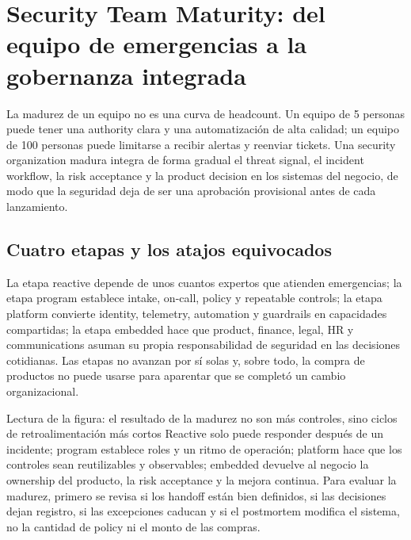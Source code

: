 \section{Security Team Maturity: del equipo de emergencias a la gobernanza integrada}

La madurez de un equipo no es una curva de headcount. Un equipo de 5 personas puede tener una authority clara y una automatización de alta calidad; un equipo de 100 personas puede limitarse a recibir alertas y reenviar tickets. Una security organization madura integra de forma gradual el threat signal, el incident workflow, la risk acceptance y la product decision en los sistemas del negocio, de modo que la seguridad deja de ser una aprobación provisional antes de cada lanzamiento.

\subsection{Cuatro etapas y los atajos equivocados}

La etapa reactive depende de unos cuantos expertos que atienden emergencias; la etapa program establece intake, on-call, policy y repeatable controls; la etapa platform convierte identity, telemetry, automation y guardrails en capacidades compartidas; la etapa embedded hace que product, finance, legal, HR y communications asuman su propia responsabilidad de seguridad en las decisiones cotidianas. Las etapas no avanzan por sí solas y, sobre todo, la compra de productos no puede usarse para aparentar que se completó un cambio organizacional.


\begin{knowledgebox}{Lectura de la figura: el resultado de la madurez no son más controles, sino ciclos de retroalimentación más cortos}
Reactive solo puede responder después de un incidente; program establece roles y un ritmo de operación; platform hace que los controles sean reutilizables y observables; embedded devuelve al negocio la ownership del producto, la risk acceptance y la mejora continua. Para evaluar la madurez, primero se revisa si los handoff están bien definidos, si las decisiones dejan registro, si las excepciones caducan y si el postmortem modifica el sistema, no la cantidad de policy ni el monto de las compras.
\end{knowledgebox}

